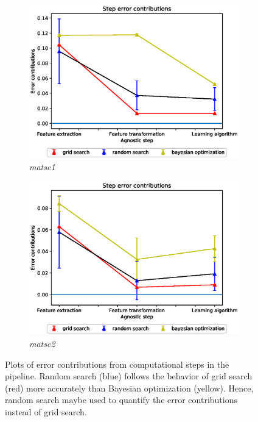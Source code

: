 \begin{figure}[ht!]
\begin{subfigure}{.5\textwidth}
  \includegraphics[scale=0.37]{img/EP/agnostic_error_steps_matsc_dataset1.eps}
  \caption{\textit{matsc1}}
  \label{fig:eq_steps_matsc1}
\end{subfigure}%
\begin{subfigure}{.5\textwidth}
  \centering
  \includegraphics[scale=0.37]{img/EP/agnostic_error_steps_matsc_dataset2.eps}
  \caption{\textit{matsc2}}
  \label{fig:eq_steps_matsc2}
\end{subfigure}
\caption{Plots of error contributions from computational steps in the pipeline. Random search (blue) follows the behavior of grid search (red) more accurately than Bayesian optimization (yellow). Hence, random search maybe used to quantify the error contributions instead of grid search.}
\label{fig:eq_steps}
\end{figure}

